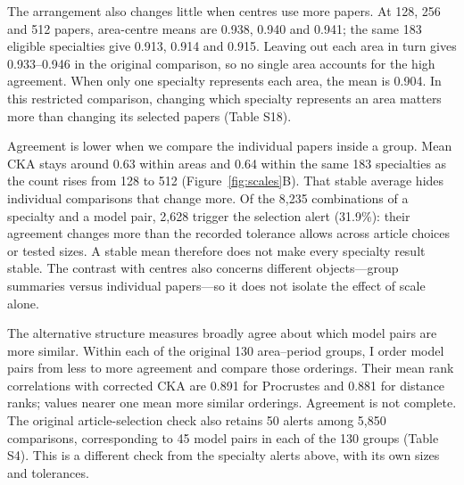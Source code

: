 \documentclass[12pt]{article}
\begin{document}
The arrangement also changes little when centres use more papers. At 128, 256 and 512 papers, area-centre means are 0.938, 0.940 and 0.941; the same 183 eligible specialties give 0.913, 0.914 and 0.915. Leaving out each area in turn gives 0.933--0.946 in the original comparison, so no single area accounts for the high agreement. When only one specialty represents each area, the mean is 0.904. In this restricted comparison, changing which specialty represents an area matters more than changing its selected papers (Table S18).

Agreement is lower when we compare the individual papers inside a group. Mean CKA stays around 0.63 within areas and 0.64 within the same 183 specialties as the count rises from 128 to 512 (Figure~\ref{fig:scales}B). That stable average hides individual comparisons that change more. Of the 8,235 combinations of a specialty and a model pair, 2,628 trigger the selection alert (31.9\%): their agreement changes more than the recorded tolerance allows across article choices or tested sizes. A stable mean therefore does not make every specialty result stable. The contrast with centres also concerns different objects---group summaries versus individual papers---so it does not isolate the effect of scale alone.

The alternative structure measures broadly agree about which model pairs are more similar. Within each of the original 130 area--period groups, I order model pairs from less to more agreement and compare those orderings. Their mean rank correlations with corrected CKA are 0.891 for Procrustes and 0.881 for distance ranks; values nearer one mean more similar orderings. Agreement is not complete. The original article-selection check also retains 50 alerts among 5,850 comparisons, corresponding to 45 model pairs in each of the 130 groups (Table S4). This is a different check from the specialty alerts above, with its own sizes and tolerances.
\end{document}
